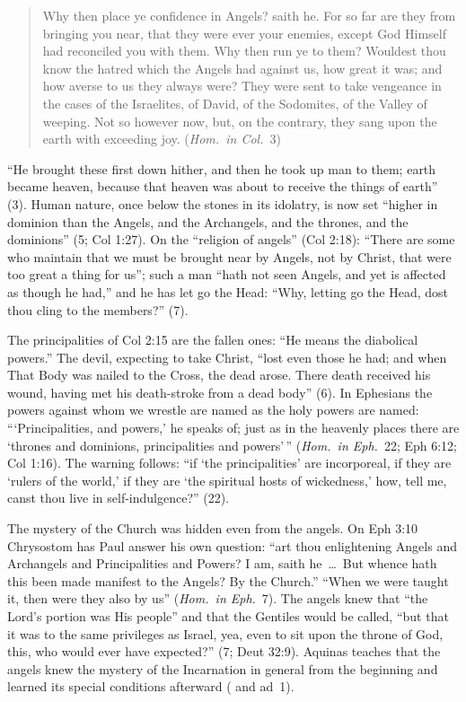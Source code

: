\begin{quote}
Why then place ye confidence in Angels? saith he. For so far are they
from bringing you near, that they were ever your enemies, except God
Himself had reconciled you with them. Why then run ye to them? Wouldest
thou know the hatred which the Angels had against us, how great it was;
and how averse to us they always were? They were sent to take vengeance
in the cases of the Israelites, of David, of the Sodomites, of the Valley
of weeping. Not so however now, but, on the contrary, they sang upon the
earth with exceeding joy. (\emph{Hom.\ in Col.}\ 3)
\end{quote}

\noindent ``He brought these first down hither, and then he took up man
to them; earth became heaven, because that heaven was about to receive
the things of earth'' (3). Human nature, once below the stones in its
idolatry, is now set ``higher in dominion than the Angels, and the
Archangels, and the thrones, and the dominions'' (5; Col 1:27). On the
``religion of angels'' (Col 2:18): ``There are some who maintain that we
must be brought near by Angels, not by Christ, that were too great a
thing for us''; such a man ``hath not seen Angels, and yet is affected as
though he had,'' and he has let go the Head: ``Why, letting go the Head,
dost thou cling to the members?'' (7).

The principalities of Col 2:15 are the fallen ones: ``He means the
diabolical powers.'' The devil, expecting to take Christ, ``lost even those
he had; and when That Body was nailed to the Cross, the dead arose. There
death received his wound, having met his death-stroke from a dead body''
(6). In Ephesians the powers against whom we wrestle are named as the
holy powers are named: ```Principalities, and powers,' he speaks of; just
as in the heavenly places there are `thrones and dominions, principalities
and powers'\,'' (\emph{Hom.\ in Eph.}\ 22; Eph 6:12; Col 1:16). The warning
follows: ``if `the principalities' are incorporeal, if they are `rulers of
the world,' if they are `the spiritual hosts of wickedness,' how, tell me,
canst thou live in self-indulgence?'' (22).

The mystery of the Church was hidden even from the angels. On Eph 3:10
Chrysostom has Paul answer his own question: ``art thou enlightening Angels
and Archangels and Principalities and Powers? I am, saith he~\dots\ But
whence hath this been made manifest to the Angels? By the Church.'' ``When
we were taught it, then were they also by us'' (\emph{Hom.\ in Eph.}\ 7).
The angels knew that ``the Lord's portion was His people'' and that the
Gentiles would be called, ``but that it was to the same privileges as
Israel, yea, even to sit upon the throne of God, this, who would ever have
expected?'' (7; Deut 32:9). Aquinas teaches that the angels knew the
mystery of the Incarnation in general from the beginning and learned its
special conditions afterward ( and ad~1).

